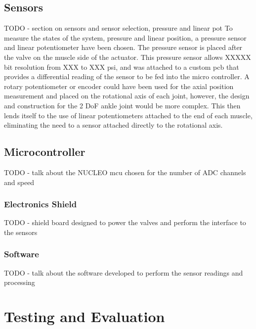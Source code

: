 \documentclass[11pt,a4paper]{article}
\begin{document}
\subsection{Sensors}
\label{sub:sensors}
\newline TODO - section on sensors and sensor selection, pressure and linear pot
To measure the states of the system, pressure and linear position, a pressure sensor and linear potentiometer have been chosen. The pressure sensor is placed after the valve on the muscle side of the actuator. This pressure sensor \cite{} allows XXXXX bit resolution from XXX to XXX psi, and was attached to a custom pcb that provides a differential reading of the sensor to be fed into the micro controller. A rotary potentiometer or encoder could have been used for the axial position measurement and placed on the rotational axis of each joint, however, the design and construction for the 2 DoF ankle joint would be more complex. This then lends itself to the use of linear potentiometers attached to the end of each muscle, eliminating the need to a sensor attached directly to the rotational axis.

\subsection{Microcontroller}
\label{sub:microcontroller}
\newline TODO - talk about the NUCLEO mcu chosen for the number of ADC channels and speed \cite{stm32_nucleo_stm32f722ze}

\subsubsection{Electronics Shield}
\label{sub:shield}
\newline TODO - shield board designed to power the valves and perform the interface to the sensors

\subsubsection{Software}
\label{sub:software}
\newline TODO - talk about the software developed to perform the sensor readings and processing

\newpage
\section{Testing and Evaluation}
\label{sec:results}
\end{document}
